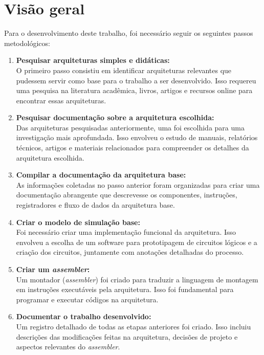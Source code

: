 \documentclass[
	12pt,				%
	openright,			%
	oneside,			%
	a4paper,			%
	english,			%
	french,				%
	spanish,			%
	brazil,				%
	]{abntex2}
\begin{document}
\section{Visão geral}
Para o desenvolvimento deste trabalho, foi necessário seguir os seguintes passos metodológicos:
\begin{enumerate}[label=\textbf{\arabic*.}]
    \item \textbf{Pesquisar arquiteturas simples e didáticas:} \\
    O primeiro passo consistiu em identificar arquiteturas relevantes que pudessem servir como base para o trabalho a ser desenvolvido. Isso requereu uma pesquisa na literatura acadêmica, livros, artigos e recursos online para encontrar essas arquiteturas.

    \item \textbf{Pesquisar documentação sobre a arquitetura escolhida:} \\
    Das arquiteturas pesquisadas anteriormente, uma foi escolhida para uma investigação mais aprofundada. Isso envolveu o estudo de manuais, relatórios técnicos, artigos e materiais relacionados para compreender os detalhes da arquitetura escolhida.

    \item \textbf{Compilar a documentação da arquitetura base:} \\
    As informações coletadas no passo anterior foram organizadas para criar uma documentação abrangente que descrevesse os componentes, instruções, registradores e fluxo de dados da arquitetura base.

    \item \textbf{Criar o modelo de simulação base:} \\
    Foi necessário criar uma implementação funcional da arquitetura. Isso envolveu a escolha de um software para prototipagem de circuitos lógicos e a criação dos circuitos, juntamente com anotações detalhadas do processo.

    \item \textbf{Criar um \textit{assembler}:} \\
    Um montador (\textit{assembler}) foi criado para traduzir a linguagem de montagem em instruções executáveis pela arquitetura. Isso foi fundamental para programar e executar códigos na arquitetura.

    \item \textbf{Documentar o trabalho desenvolvido:} \\
    Um registro detalhado de todas as etapas anteriores foi criado. Isso incluiu descrições das modificações feitas na arquitetura, decisões de projeto e aspectos relevantes do \textit{assembler}.


\end{enumerate}
\end{document}
